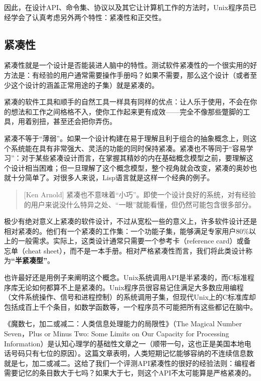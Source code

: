 \documentclass[12pt,oneside]{book}
\begin{document}
因此，在设计API、命令集、协议以及其它让计算机工作的方法时，Unix程序员已经学会了认真考虑另外两个特性：紧凑性和正交性。

\subsection{紧凑性}
紧凑性就是一个设计是否能装进人脑中的特性。测试软件紧凑性的一个很实用的好方法是：有经验的用户通常需要操作手册吗？如果不需要，那么这个设计（或者至少这个设计的涵盖正常用途的子集）就是紧凑的。

紧凑的软件工具和顺手的自然工具一样具有同样的优点：让人乐于使用，不会在你的想法和工作之间格格不入，使你工作起来更有成效——完全不像那些蹩脚的工具，用着别扭，甚至还会把你弄伤。

紧凑不等于“薄弱”。如果一个设计构建在易于理解且利于组合的抽象概念上，则这个系统能在具有非常强大、灵活的功能的同时保持紧凑。紧凑也不等同于“容易学习”：对于某些紧凑设计而言，在掌握其精妙的内在基础概念模型之前，要理解这个设计相当困难；但一旦理解了这个概念模型，整个视角就会改变，紧凑的奥妙也就十分简单了。对很多人来说，Lisp语言就是这样一个经典的例子。

\begin{quote}[Ken Arnold]
紧凑也不意味着“小巧”。即使一个设计良好的系统，对有经验的用户来说没什么特异之处、“一眼”就能看懂，但仍然可能包含很多部分。
\end{quote}

极少有绝对意义上紧凑的软件设计，不过从宽松一些的意义上，许多软件设计还是相对紧凑的。他们有一个紧凑的工作集：一个功能子集，能够满足专家用户80\%以上的一般需求。实际上，这类设计通常只需要一个参考卡（reference card）或备忘单（cheat sheet），而不是一本手册。相对严格紧凑性而言，我们将此类设计称为\textbf{“半紧凑型”}。

也许最好还是用例子来阐明这个概念。Unix系统调用API是半紧凑的，而C标准程序库无论如何都算不上是紧凑的。Unix程序员很容易记住满足大多数应用编程（文件系统操作、信号和进程控制）的系统调用子集，但现代Unix上的C标准库却包括成百上千个条目，如数学函数等，一个程序员不可能把所有这些都记在脑中。

《魔数七，加二或减二：人类信息处理能力的局限性》（The Magical Number Seven，Plus or Minus Two: Some Limits on Our Capacity for Processing Information\cite{Miller}）是认知心理学的基础性文章之一（顺带一句，这也正是美国本地电话号码只有七位的原因）。这篇文章表明，人类短期记忆能够容纳的不连续信息数就是七，加二或减二。这给了我们一个评测API紧凑性的很好的经验法则：编程者需要记忆的条目数大于七吗？如果大于七，则这个API不太可能算是严格紧凑的。
\end{document}

